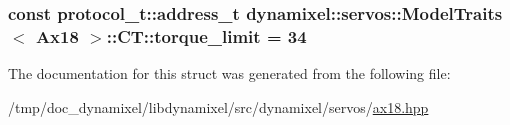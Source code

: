 \subsubsection[{torque\+\_\+limit}]{\setlength{\rightskip}{0pt plus 5cm}const {\bf protocol\+\_\+t\+::address\+\_\+t} {\bf dynamixel\+::servos\+::\+Model\+Traits}$<$ {\bf Ax18} $>$\+::C\+T\+::torque\+\_\+limit = 34\hspace{0.3cm}{\ttfamily [static]}}\label{structdynamixel_1_1servos_1_1_model_traits_3_01_ax18_01_4_1_1_c_t_adc924944d89e2ce6f0194625d2d8d99d}


The documentation for this struct was generated from the following file\+:\begin{DoxyCompactItemize}
\item 
/tmp/doc\+\_\+dynamixel/libdynamixel/src/dynamixel/servos/\hyperlink{ax18_8hpp}{ax18.\+hpp}\end{DoxyCompactItemize}
